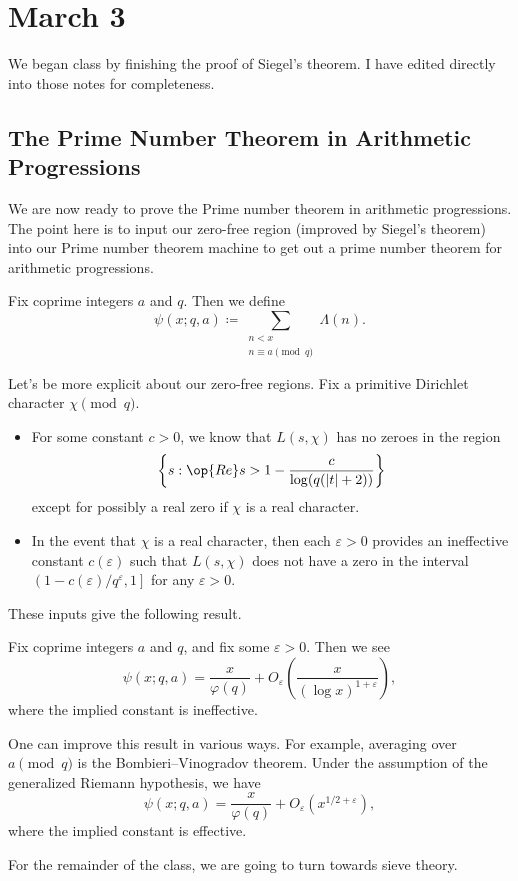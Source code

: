 \documentclass[../notes.tex]{subfiles}
\begin{document}
\section{March 3}

We began class by finishing the proof of Siegel's theorem. I have edited directly into those notes for completeness.

\subsection{The Prime Number Theorem in Arithmetic Progressions}
We are now ready to prove the Prime number theorem in arithmetic progressions. The point here is to input our zero-free region (improved by Siegel's theorem) into our Prime number theorem machine to get out a prime number theorem for arithmetic progressions.
\begin{definition}
	Fix coprime integers $a$ and $q$. Then we define
	\[\psi(x;q,a)\coloneqq\sum_{\substack{n<x\\n\equiv a\pmod q}}\Lambda(n).\]
\end{definition}
Let's be more explicit about our zero-free regions. Fix a primitive Dirichlet character $\chi\pmod q$.
\begin{itemize}
	\item For some constant $c>0$, we know that $L(s,\chi)$ has no zeroes in the region
	\[\left\{s:\op{Re}s>1-\frac c{\log(q(|t|+2))}\right\}\]
	except for possibly a real zero if $\chi$ is a real character.
	\item In the event that $\chi$ is a real character, then each $\varepsilon>0$ provides an ineffective constant $c(\varepsilon)$ such that $L(s,\chi)$ does not have a zero in the interval $\left(1-c(\varepsilon)/q^\varepsilon,1\right]$ for any $\varepsilon>0$.
\end{itemize}
These inputs give the following result.
\begin{theorem}
	Fix coprime integers $a$ and $q$, and fix some $\varepsilon>0$. Then we see
	\[\psi(x;q,a)=\frac x{\varphi(q)}+O_\varepsilon\left(\frac x{(\log x)^{1+\varepsilon}}\right),\]
	where the implied constant is ineffective.
\end{theorem}
\begin{remark}
	One can improve this result in various ways. For example, averaging over $a\pmod q$ is the Bombieri--Vinogradov theorem. Under the assumption of the generalized Riemann hypothesis, we have
	\[\psi(x;q,a)=\frac x{\varphi(q)}+O_\varepsilon\left(x^{1/2+\varepsilon}\right),\]
	where the implied constant is effective.
\end{remark}
For the remainder of the class, we are going to turn towards sieve theory.
\end{document}
